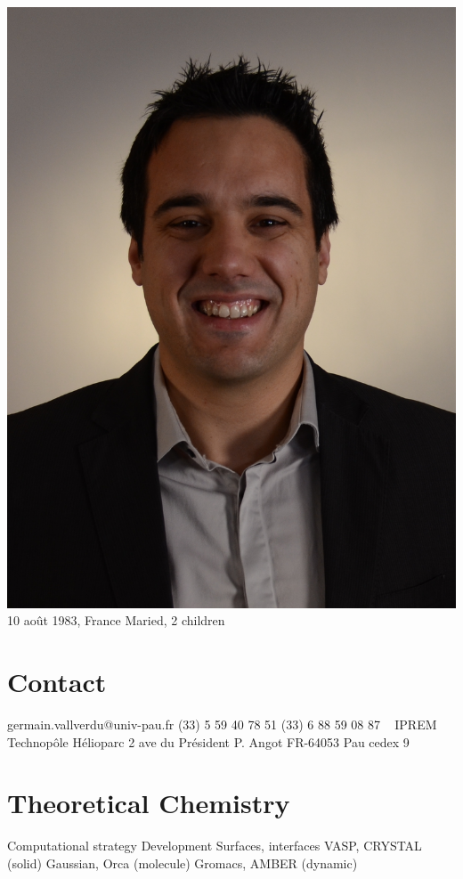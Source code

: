 \documentclass{cv-style}     %
\begin{document}


\begin{aside}
    \includegraphics[width=.8\columnwidth]{img/gvallver}
    10 août 1983, France
    Maried, 2 children
    \section{Contact}
    germain.vallverdu@univ-pau.fr
    (33) 5 59 40 78 51
    (33) 6 88 59 08 87
    ~
    IPREM
    Technopôle Hélioparc
    2 ave du Président P. Angot
    FR-64053 Pau cedex 9
    \section{Theoretical Chemistry}
    Computational strategy
    Development
    Surfaces, interfaces
    VASP, CRYSTAL (solid)
    Gaussian, Orca (molecule)
    Gromacs, AMBER (dynamic)

\end{aside}
\end{document}
